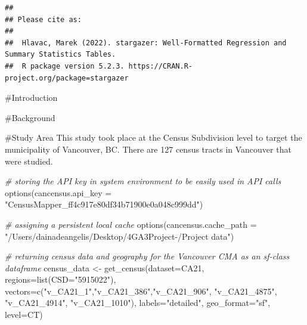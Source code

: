 \documentclass[
]{article}
\newenvironment{Shaded}{\begin{snugshade}}{\end{snugshade}}
\newcommand{\AttributeTok}[1]{\textcolor[rgb]{0.77,0.63,0.00}{#1}}
\newcommand{\CommentTok}[1]{\textcolor[rgb]{0.56,0.35,0.01}{\textit{#1}}}
\newcommand{\FunctionTok}[1]{\textcolor[rgb]{0.00,0.00,0.00}{#1}}
\newcommand{\NormalTok}[1]{#1}
\newcommand{\OtherTok}[1]{\textcolor[rgb]{0.56,0.35,0.01}{#1}}
\newcommand{\StringTok}[1]{\textcolor[rgb]{0.31,0.60,0.02}{#1}}
\begin{document}
\begin{verbatim}
## 
## Please cite as: 
## 
##  Hlavac, Marek (2022). stargazer: Well-Formatted Regression and Summary Statistics Tables.
##  R package version 5.2.3. https://CRAN.R-project.org/package=stargazer
\end{verbatim}

\#Introduction

\#Background

\#Study Area This study took place at the Census Subdivision level to
target the municipality of Vancouver, BC. There are 127 census tracts in
Vancouver that were studied.

\begin{Shaded}
\begin{Highlighting}[]
\CommentTok{\# storing the API key in system environment to be easily used in API calls}
\FunctionTok{options}\NormalTok{(}\AttributeTok{cancensus.api\_key =} \StringTok{"CensusMapper\_ff4c917e80df34b71900e0a048c999dd"}\NormalTok{)}
\end{Highlighting}
\end{Shaded}

\begin{Shaded}
\begin{Highlighting}[]
\CommentTok{\# assigning a persistent local cache}
\FunctionTok{options}\NormalTok{(}\AttributeTok{cancensus.cache\_path =} \StringTok{"/Users/dainadeangelis/Desktop/4GA3Project{-}/Project data"}\NormalTok{)}
\end{Highlighting}
\end{Shaded}

\begin{Shaded}
\begin{Highlighting}[]
\CommentTok{\# returning census data and geography for the Vancouver CMA as an sf{-}class dataframe}
\NormalTok{census\_data }\OtherTok{\textless{}{-}} \FunctionTok{get\_census}\NormalTok{(}\AttributeTok{dataset=}\StringTok{\textquotesingle{}CA21\textquotesingle{}}\NormalTok{, }\AttributeTok{regions=}\FunctionTok{list}\NormalTok{(}\AttributeTok{CSD=}\StringTok{"5915022"}\NormalTok{), }\AttributeTok{vectors=}\FunctionTok{c}\NormalTok{(}\StringTok{"v\_CA21\_1"}\NormalTok{,}\StringTok{"v\_CA21\_386"}\NormalTok{,}\StringTok{"v\_CA21\_906"}\NormalTok{, }\StringTok{"v\_CA21\_4875"}\NormalTok{, }\StringTok{"v\_CA21\_4914"}\NormalTok{, }\StringTok{"v\_CA21\_1010"}\NormalTok{), }\AttributeTok{labels=}\StringTok{"detailed"}\NormalTok{, }\AttributeTok{geo\_format=}\StringTok{"sf"}\NormalTok{, }\AttributeTok{level=}\StringTok{\textquotesingle{}CT\textquotesingle{}}\NormalTok{)}
\end{Highlighting}
\end{Shaded}
\end{document}

